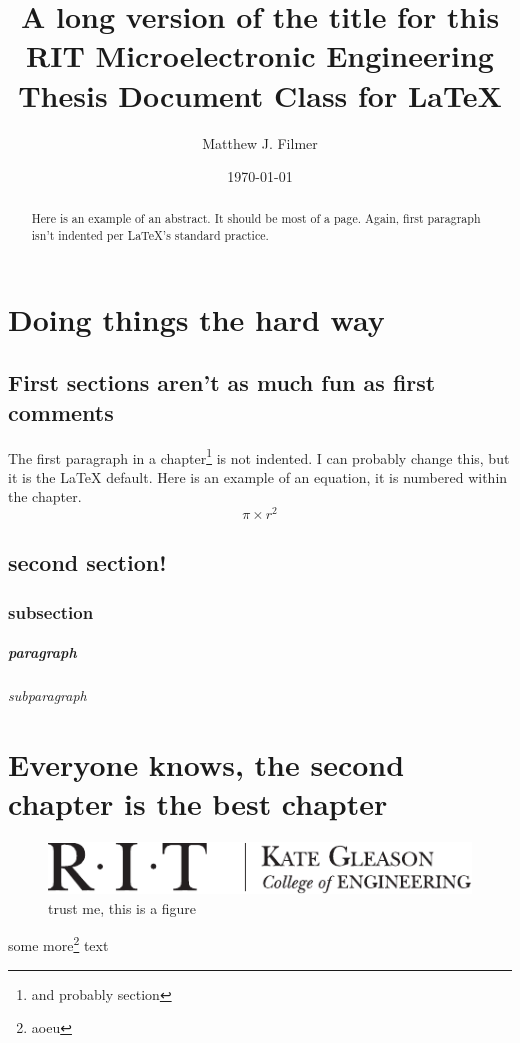 \documentclass[oneside]{ritthesis}
\author{Matthew J. Filmer}
\title{A long version of the title for this RIT Microelectronic Engineering Thesis Document Class for \LaTeX{}}
\date{\today}
\begin{document}
\makefrontmatter

\begin{acknowledgments}
\lipsum[4-6]
\end{acknowledgments}

\begin{abstract}
Here is an example of an abstract. It should be most of a page. Again, first paragraph isn't indented per \LaTeX{}'s standard practice. 

\lipsum[1-2] 
\end{abstract}

\makealllists

\mainmatter
\chapter{Doing things the hard way}
\section{First sections aren't as much fun as first comments}
The first paragraph in a chapter\footnote{and probably section} is not indented. I can probably change this, but it is the \LaTeX{} default. Here is an example of an equation, it is numbered within the chapter. 
\begin{equation}
\pi\times r^2
\label{equ:area}
\end{equation}
\section{second section!}
\subsection{subsection}
\paragraph{paragraph}
\subparagraph{subparagraph}
\lipsum{}
\chapter{Everyone knows, the second chapter is the best chapter}
\lipsum{}
\begin{figure}
\centering
\includegraphics{kgcoelogo}
\caption{trust me, this is a figure}
\label{fig:samp}
\end{figure}
some more\footnote{aoeu} text
\end{document}
